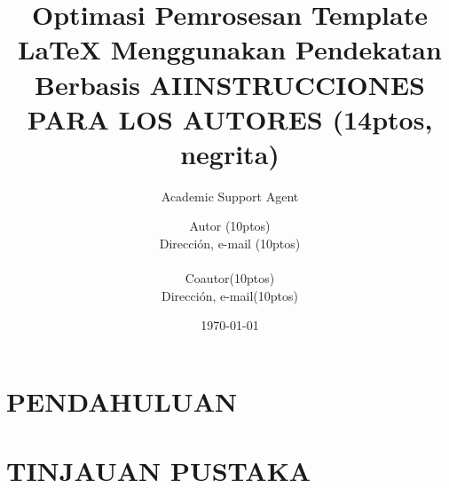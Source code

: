 \documentclass{article}
\title{Optimasi Pemrosesan Template LaTeX Menggunakan Pendekatan Berbasis AI}
\author{Academic Support Agent}
\date{\today}
\begin{document}
\maketitle

\begin{abstract}

\end{abstract}

\chapter{PENDAHULUAN}


\chapter{TINJAUAN PUSTAKA}


\usepackage{ja19}
\usepackage[dvips]{graphicx}
\usepackage[utf8]{inputenc} %

\title{INSTRUCCIONES PARA LOS AUTORES (14ptos, negrita)}

\author{Autor (10ptos)\\Direcci\'{o}n, e-mail (10ptos) \\ \\ Coautor(10ptos)\\ Direcci\'{o}n, e-mail(10ptos)}
\end{document}
